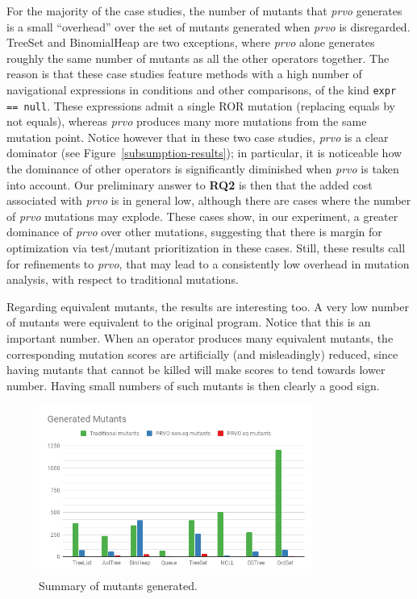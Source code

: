 For the majority of the case studies, the number of mutants that \emph{prvo} generates is a small ``overhead'' over the set of mutants generated when \emph{prvo} is disregarded. TreeSet and BinomialHeap are two exceptions, where \emph{prvo} alone generates roughly the same number of mutants as all the other operators together. The reason is that these case studies feature methods with a high number of navigational expressions in conditions and other comparisons, of the kind \texttt{expr == null}. These expressions admit a single ROR mutation (replacing equals by not equals), whereas \emph{prvo} produces many more mutations from the same mutation point. Notice however that in these two case studies, \emph{prvo} is a clear dominator (see Figure~\ref{subsumption-results}); in particular, it is noticeable how the dominance of other operators is significantly diminished when \emph{prvo} is taken into account. Our preliminary answer to \textbf{RQ2} is then that the added cost associated with \emph{prvo} is in general low, although there are cases where the number of \emph{prvo} mutations may explode. These cases show, in our experiment, a greater dominance of \emph{prvo} over other mutations, suggesting that there is margin for optimization via test/mutant prioritization in these cases. Still, these results call for refinements to \emph{prvo}, that may lead to a consistently low overhead in mutation analysis, with respect to traditional mutations.

Regarding equivalent mutants, the results are interesting too. A very low number of mutants were equivalent to the original program. Notice that this is an important number. When an operator produces many equivalent mutants, the corresponding mutation scores are artificially (and misleadingly) reduced, since having mutants that cannot be killed will make scores to tend towards lower number. Having small numbers of such mutants is then clearly a good sign.     



\begin{figure}[t]
	\begin{center}
		\includegraphics[width=9cm]{figures/Generated_Mutants.png}
	\end{center}
	\caption{Summary of mutants generated.}
	\label{mutants-results}
\end{figure}


